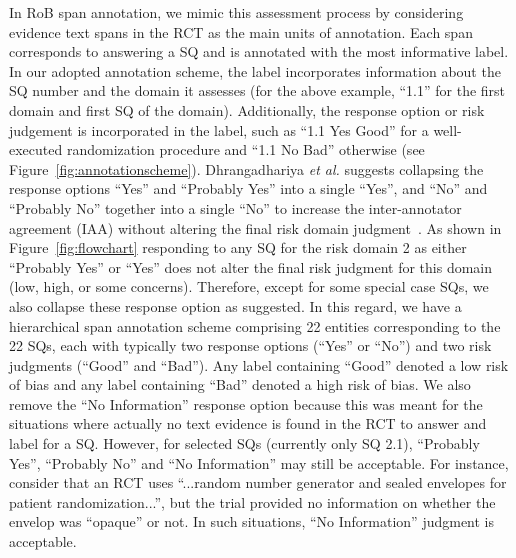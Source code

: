 \documentclass[sn-mathphys,Numbered]{sn-jnl}%
\theoremstyle{thmstyleone}%
\theoremstyle{thmstyletwo}%
\theoremstyle{thmstylethree}%
\begin{document}
In RoB span annotation, we mimic this assessment process by considering evidence text spans in the RCT as the main units of annotation.
Each span corresponds to answering a SQ and is annotated with the most informative label. 
In our adopted annotation scheme, the label incorporates information about the SQ number and the domain it assesses (for the above example, ``1.1'' for the first domain and first SQ of the domain).
Additionally, the response option or risk judgement is incorporated in the label, such as ``1.1 Yes Good'' for a well-executed randomization procedure and ``1.1 No Bad'' otherwise (see Figure~\ref{fig:annotationscheme}).
Dhrangadhariya \textit{et al.} suggests collapsing the response options ``Yes'' and ``Probably Yes'' into a single ``Yes'', and ``No'' and ``Probably No'' together into a single ``No'' to increase the inter-annotator agreement (IAA) without altering the final risk domain judgment~\cite{dhrangadhariya2023first}.
As shown in Figure~\ref{fig:flowchart} responding to any SQ for the risk domain 2 as either ``Probably Yes'' or ``Yes'' does not alter the final risk judgment for this domain (low, high, or some concerns).
Therefore, except for some special case SQs, we also collapse these response option as suggested.
In this regard, we have a hierarchical span annotation scheme comprising 22 entities corresponding to the 22 SQs, each with typically two response options (``Yes'' or ``No'') and two risk judgments (``Good'' and ``Bad'').
Any label containing ``Good'' denoted a low risk of bias and any label containing ``Bad'' denoted a high risk of bias.
We also remove the ``No Information'' response option because this was meant for the situations where actually no text evidence is found in the RCT to answer and label for a SQ.
However, for selected SQs (currently only SQ 2.1), ``Probably Yes'', ``Probably No'' and ``No Information'' may still be acceptable.
For instance, consider that an RCT uses ``...random number generator and sealed envelopes for patient randomization...'', but the trial provided no information on whether the envelop was ``opaque'' or not.
In such situations, ``No Information'' judgment is acceptable.
\end{document}
